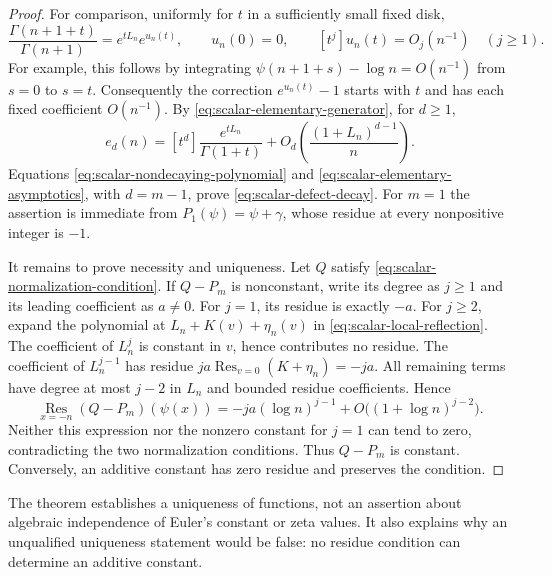 \begin{proof}
For comparison, uniformly for $t$ in a sufficiently small fixed disk,
\begin{equation}
 \frac{\Gamma(n+1+t)}{\Gamma(n+1)}
    =e^{tL_n}e^{u_n(t)},\qquad
 u_n(0)=0,\qquad [t^j]u_n(t)=O_j(n^{-1})\quad(j\geq1).
 \label{eq:scalar-gamma-ratio-error}
\end{equation}
For example, this follows by integrating
$\psi(n+1+s)-\log n=O(n^{-1})$ from $s=0$ to $s=t$.
Consequently the correction $e^{u_n(t)}-1$ starts with $t$ and
has each fixed coefficient $O(n^{-1})$.  By
\eqref{eq:scalar-elementary-generator}, for $d\geq1$,
\begin{equation}
 e_d(n)=[t^d]\frac{e^{tL_n}}{\Gamma(1+t)}
       +O_d\!\left(\frac{(1+L_n)^{d-1}}{n}\right).
 \label{eq:scalar-elementary-asymptotics}
\end{equation}
Equations \eqref{eq:scalar-nondecaying-polynomial} and
\eqref{eq:scalar-elementary-asymptotics}, with $d=m-1$, prove
\eqref{eq:scalar-defect-decay}.  For $m=1$ the assertion is
immediate from $P_1(\psi)=\psi+\gamma$, whose residue at every
nonpositive integer is $-1$.

It remains to prove necessity and uniqueness.  Let $Q$ satisfy
\eqref{eq:scalar-normalization-condition}.  If $Q-P_m$ is
nonconstant, write its degree as $j\geq1$ and its leading
coefficient as $a\ne0$.  For $j=1$, its residue is exactly
$-a$.  For $j\geq2$, expand the polynomial at
$L_n+K(v)+\eta_n(v)$ in \eqref{eq:scalar-local-reflection}.
The coefficient of $L_n^j$ is constant in $v$, hence contributes
no residue.  The coefficient of $L_n^{j-1}$ has residue
$ja\operatorname*{Res}_{v=0}(K+\eta_n)=-ja$.  All remaining
terms have degree at most $j-2$ in $L_n$ and bounded residue
coefficients.  Hence
\begin{equation}
 \operatorname*{Res}_{x=-n}(Q-P_m)(\psi(x))
      =-ja(\log n)^{j-1}
          +O\bigl((1+\log n)^{j-2}\bigr).
 \label{eq:scalar-uniqueness-leading-term}
\end{equation}
Neither this expression nor the nonzero constant for $j=1$ can
tend to zero, contradicting the two normalization conditions.
Thus $Q-P_m$ is constant.  Conversely, an additive constant has
zero residue and preserves the condition.
\end{proof}

The theorem establishes a uniqueness of functions, not an assertion
about algebraic independence of Euler's constant or zeta values.
It also explains why an unqualified uniqueness statement would be
false: no residue condition can determine an additive constant.


